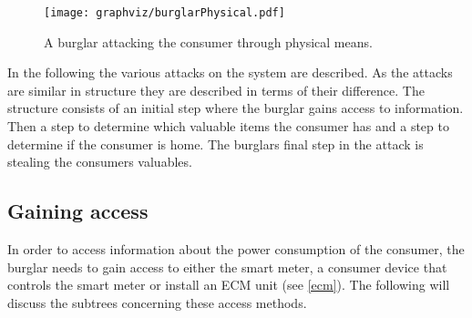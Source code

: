



\begin{figure}
\center
\texttt{[image: graphviz/burglarPhysical.pdf]}
\caption{A burglar attacking the consumer through physical means.}
\label{attacktree:burglar:physical}
\end{figure}

In the following the various attacks on the system are described.
As the attacks are similar in structure they are described in terms of their difference.
The structure consists of an initial step where the burglar gains access to information.
Then a step to determine which valuable items the consumer has and a step to determine if the consumer is home.
The burglars final step in the attack is stealing the consumers valuables.

\subsection{Gaining access}
In order to access information about the power consumption of the consumer, the burglar needs to gain access to either the smart meter, a consumer device that controls the smart meter or install an ECM unit (see \cref{ecm}).
The following will discuss the subtrees concerning these access methods.

